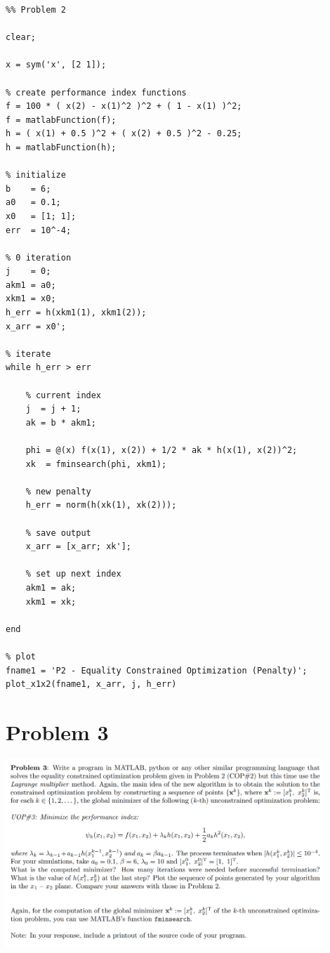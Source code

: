 \documentclass[conf]{new-aiaa}
\begin{document}
\begin{lstlisting}
%% Problem 2 

clear; 

x = sym('x', [2 1]); 

% create performance index functions 
f = 100 * ( x(2) - x(1)^2 )^2 + ( 1 - x(1) )^2; 
f = matlabFunction(f); 
h = ( x(1) + 0.5 )^2 + ( x(2) + 0.5 )^2 - 0.25; 
h = matlabFunction(h); 

% initialize 
b    = 6;
a0   = 0.1; 
x0   = [1; 1]; 
err  = 10^-4; 

% 0 iteration 
j    = 0; 
akm1 = a0; 
xkm1 = x0; 
h_err = h(xkm1(1), xkm1(2));
x_arr = x0'; 

% iterate 
while h_err > err 
	
	% current index 
	j  = j + 1;  
	ak = b * akm1; 

	phi = @(x) f(x(1), x(2)) + 1/2 * ak * h(x(1), x(2))^2; 
	xk  = fminsearch(phi, xkm1); 
	
	% new penalty 
	h_err = norm(h(xk(1), xk(2))); 
	
	% save output 
	x_arr = [x_arr; xk']; 
	
	% set up next index 
	akm1 = ak; 
	xkm1 = xk; 
	
end 

% plot 
fname1 = 'P2 - Equality Constrained Optimization (Penalty)'; 
plot_x1x2(fname1, x_arr, j, h_err)
\end{lstlisting}

\newpage
\section*{Problem 3}

\begin{center}
	\includegraphics[width=0.9\textwidth]{P3.png}
\end{center}
\end{document}
